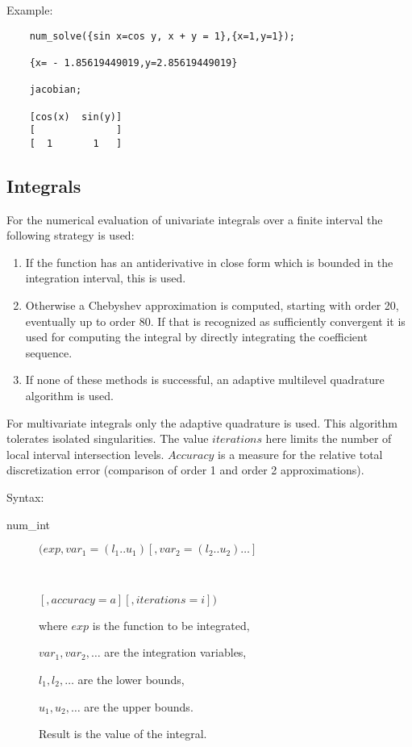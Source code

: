 Example:
\begin{verbatim}
    num_solve({sin x=cos y, x + y = 1},{x=1,y=1});

    {x= - 1.85619449019,y=2.85619449019}

    jacobian;

    [cos(x)  sin(y)]
    [              ]
    [  1       1   ]
\end{verbatim}

\subsection{Integrals}
\hypertarget{operator:NUM_INT}{}

For the numerical evaluation of univariate integrals over a finite
interval the following strategy is used:
\begin{enumerate}
\item If the function has an antiderivative in close form
    which is bounded in the integration interval, this
    is used.
\item Otherwise a Chebyshev approximation is computed,
    starting with order 20, eventually up to order 80.
    If that is recognized as sufficiently convergent
    it is used for computing the integral by directly
    integrating the coefficient sequence.
\item If none of these methods is successful, an
    adaptive multilevel quadrature algorithm is used.
\end{enumerate}
For multivariate integrals only the adaptive quadrature is used.
This algorithm tolerates isolated singularities.
The value $iterations$ here limits the number of
local interval intersection levels.
$Accuracy$ is a measure for the relative total discretization
error (comparison of order 1 and order 2 approximations).

Syntax:

\begin{description}
\item[num\_int] $(exp,var_1=(l_1 .. u_1)[,var_2=(l_2 .. u_2)\ldots]$
\item[\ \ \ \ \ \ ]$[,accuracy=a][,iterations=i])$

where $exp$ is the function to be integrated,

$var_1, var_2 , \ldots$ are the integration variables,

$l_1, l_2 , \ldots$ are the lower bounds,

$u_1, u_2 , \ldots$ are the upper bounds.

Result is the value of the integral.

\end{description}

